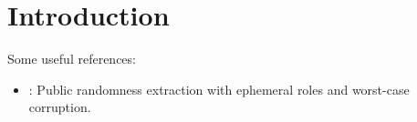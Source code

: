 \section{Introduction}


Some useful references:
\begin{itemize}
    \item \cite{C:NieRibObr22}: Public randomness extraction with ephemeral roles and worst-case corruption. 
\end{itemize}